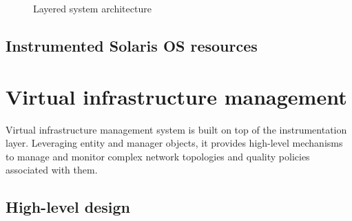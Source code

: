 \documentclass[11pt]{book}
\begin{document}
        \begin{figure}[H]
          \begin{center}
          \end{center}

          \caption{Layered system architecture}
        \end{figure}




      \subsection{Instrumented Solaris OS resources}



    \section{Virtual infrastructure management}

      Virtual infrastructure management system is built on top of the instrumentation layer. Leveraging entity and
      manager objects, it provides high-level mechanisms to manage and monitor complex network topologies and quality
      policies associated with them.


      \subsection{High-level design}
\end{document}
